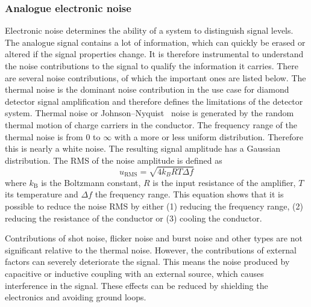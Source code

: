 \subsubsection{Analogue electronic noise}
Electronic noise determines the ability of a system to distinguish signal levels. The analogue signal contains a lot of information, which can quickly be erased or altered if the signal properties change. It is therefore instrumental to understand the noise contributions to the signal to qualify the information it carries. There are several noise contributions, of which the important ones are listed below. The thermal noise is the dominant noise contribution in the use case for diamond detector signal amplification and therefore defines the limitations of the detector system. Thermal noise or Johnson--Nyquist~\cite{} noise is generated by the random thermal motion of charge carriers in the conductor. The frequency range of the thermal noise is from 0 to $\infty$ with a more or less uniform distribution. Therefore this is nearly a white noise. The resulting signal amplitude has a Gaussian distribution. The RMS of the noise amplitude is defined as
\begin{equation}
\label{eq:thermnoise}
u_\mathrm{RMS}=\sqrt{4k_BRT\Delta f}
\end{equation}
where $k_\mathrm{B}$ is the Boltzmann constant, $R$ is the input resistance of the amplifier, $T$ its temperature and $\Delta f$ the frequency range. This equation shows that it is possible to reduce the noise RMS by either (1) reducing the frequency range, (2) reducing the resistance of the conductor or (3) cooling the conductor. 

Contributions of shot noise, flicker noise and burst noise and other types are not significant relative to the thermal noise. However, the contributions of external factors can severely deteriorate the signal. This means the noise produced by capacitive or inductive coupling with an external source, which causes interference in the signal. These effects can be reduced by shielding the electronics and avoiding ground loops. 

